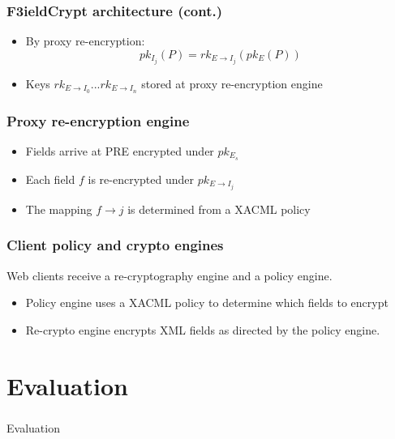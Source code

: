 \documentclass{beamer}
\begin{document}
\begin{frame}
\frametitle{F3ieldCrypt architecture (cont.)}
\begin{itemize}
\item By proxy re-encryption:
\begin{equation*}
pk_{I_j}(P) = rk_{E \to I_j}( pk_E (P))
\end{equation*}
\item Keys $rk_{E \to I_0}...rk_{E \to I_n}$ stored at \alert{proxy
re-encryption engine}
\end{itemize}
\end{frame}

\begin{frame}
\frametitle{Proxy re-encryption engine}
\begin{itemize}
\item Fields arrive at PRE encrypted under $pk_{E_s}$
\item Each field $f$ is re-encrypted under $pk_{E \to I_j}$
\item The mapping $f \to j$ is determined from a XACML policy
\end{itemize}
\end{frame}

\begin{frame}
\frametitle{Client policy and crypto engines}
Web clients receive a re-cryptography engine and a policy engine. 
\medskip
\begin{itemize}
\item \alert{Policy engine} uses a XACML policy to determine which fields to
encrypt
\item \alert{Re-crypto engine} encrypts XML fields as directed by the policy
engine.
\end{itemize}
\end{frame}


\section{Evaluation}
\begin{frame}
\frametitle{}
\begin{center}
Evaluation
\end{center}
\end{frame}
\end{document}
